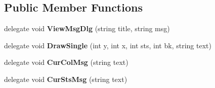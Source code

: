 \subsection*{Public Member Functions}
\begin{DoxyCompactItemize}
\item 
delegate void {\bfseries View\+Msg\+Dlg} (string title, string msg)\hypertarget{class_reversi4color_wpf_1_1_reversi_play_a3c10ef6a2029cfb724483c6cdd530de7}{}\label{class_reversi4color_wpf_1_1_reversi_play_a3c10ef6a2029cfb724483c6cdd530de7}

\item 
delegate void {\bfseries Draw\+Single} (int y, int x, int sts, int bk, string text)\hypertarget{class_reversi4color_wpf_1_1_reversi_play_a2ea4ca0b01179f4cb9f7ffb6197593b1}{}\label{class_reversi4color_wpf_1_1_reversi_play_a2ea4ca0b01179f4cb9f7ffb6197593b1}

\item 
delegate void {\bfseries Cur\+Col\+Msg} (string text)\hypertarget{class_reversi4color_wpf_1_1_reversi_play_a338c8533b516b8da2cbb423e91ceeec8}{}\label{class_reversi4color_wpf_1_1_reversi_play_a338c8533b516b8da2cbb423e91ceeec8}

\item 
delegate void {\bfseries Cur\+Sts\+Msg} (string text)\hypertarget{class_reversi4color_wpf_1_1_reversi_play_a39d4ed7110498dd72556c675020b786c}{}\label{class_reversi4color_wpf_1_1_reversi_play_a39d4ed7110498dd72556c675020b786c}


\end{DoxyCompactItemize}
